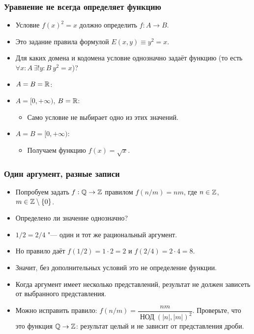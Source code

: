 \documentclass[10pt]{beamer}
\begin{document}
\begin{frame}
    \frametitle{Уравнение не всегда определяет функцию}
    \begin{itemize}
        \item Условие $f(x)^2=x$ должно определить $f:A\to B$.
        \item Это задание правила формулой $E(x,y)\equiv y^2=x$.
        \item Для каких домена и кодомена условие однозначно задаёт функцию (то есть \pause $\forall x:A~\exists!y:B~y^2=x$)?
        \item<3-> $A=B=\mathbb{R}$: 
        \item<5-> $A=[0,+\infty)$, $B=\mathbb{R}$: 
        \begin{itemize}
            \item<7-> Само условие не выбирает одно из этих значений.
        \end{itemize}
        \item<8-> $A=B=[0,+\infty)$: 
        \begin{itemize}
            \item<10-> Получаем функцию $f(x)=\sqrt{x}$.
        \end{itemize}
    \end{itemize}
\end{frame}

\begin{frame}
    \frametitle{Один аргумент, разные записи}
    \begin{itemize}
        \item Попробуем задать $f:\mathbb{Q}\to\mathbb{Z}$ правилом $f(n/m)=nm$, где $n\in\mathbb{Z}$, $m\in\mathbb{Z}\setminus\{0\}$.
        \item Определено ли значение однозначно?
        \item<2-> $1/2=2/4$ "--- один и тот же рациональный аргумент.
        \item<3-> Но правило даёт $f(1/2)=1\cdot2=2$ и $f(2/4)=2\cdot4=8$.
        \item<4-> Значит, без дополнительных условий это не определение функции.
        \item<5-> Когда аргумент имеет несколько представлений, результат не должен зависеть от выбранного представления.
        \item<6-> Можно исправить правило: $f(n/m)=\dfrac{nm}{\operatorname{\text{НОД}}(|n|,|m|)^2}$. Проверьте, что это функция $\mathbb{Q}\to\mathbb{Z}$: результат целый и не зависит от представления дроби.
    \end{itemize}
\end{frame}
\end{document}
